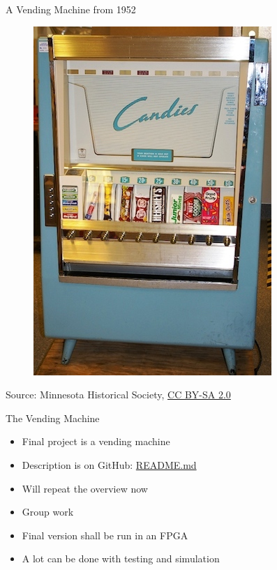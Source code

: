 \begin{frame}[fragile]{A Vending Machine from 1952}
\begin{figure}
    \centering
    \href{https://en.wikipedia.org/wiki/File:CandiesVendingMachine1952.jpg}{\includegraphics[scale=0.4]{CandiesVendingMachine1952}}

\end{figure}

{\tiny Source: Minnesota Historical Society, \href{https://creativecommons.org/licenses/by-sa/2.0}{CC BY-SA 2.0}}
\end{frame}

\begin{frame}[fragile]{The Vending Machine}
\begin{itemize}
\item Final project is a vending machine
\item Description is on GitHub: \href{https://github.com/schoeberl/chisel-lab/tree/master/vending}{README.md}
\item Will repeat the overview now
\item Group work
\item Final version shall be run in an FPGA
\item A lot can be done with testing and simulation
\end{itemize}
\end{frame}

